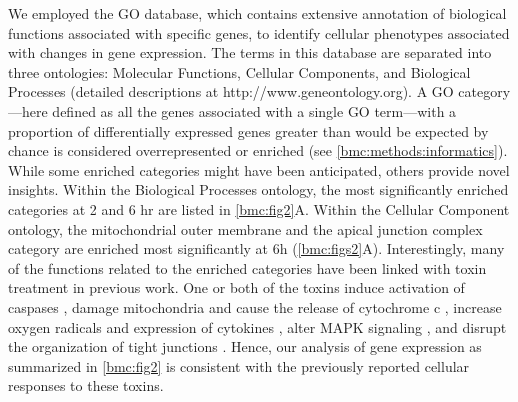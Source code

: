 We employed the GO database, which contains extensive 
annotation of biological functions associated with specific 
genes, to identify cellular phenotypes associated with 
changes in gene expression. The terms in this database are 
separated into three ontologies: Molecular Functions, Cellular 
Components, and Biological Processes (detailed descriptions 
at http://www.geneontology.org). A GO category—here defined 
as all the genes associated with a single GO term—with a 
proportion of differentially expressed genes greater than 
would be expected by chance is considered overrepresented 
or enriched (see \ref{bmc:methods:informatics}). While 
some enriched categories might have been anticipated, 
others provide novel insights. Within the Biological 
Processes ontology, the most significantly enriched 
categories at 2 and 6 hr are listed in \autoref{bmc:fig2}A. 
Within the Cellular Component ontology, the mitochondrial 
outer membrane and the apical junction complex category 
are enriched most significantly at 6h (\autoref{bmc:figs2}A). 
Interestingly, many of the functions related to the 
enriched categories have been linked with toxin treatment 
in previous work. One or both of the toxins induce 
activation of caspases 
\cite{Gerhard:2008wz, QaaposDan:2002uj, Carneiro:2006cw, Brito:2002ky}, 
damage mitochondria and cause the release of cytochrome c 
\cite{Matarrese:2007ix, He:2000uc}, increase oxygen radicals 
and expression of cytokines \cite{He:2002cl,Qiu:1999us,Flegel:1991ws}, 
alter MAPK signaling \cite{Meyer:2007kj,Lee:2007gj,Na:2005bx}, 
and disrupt the organization of tight junctions \cite{Nusrat:2001cs}. 
Hence, our analysis of gene expression as summarized in 
\autoref{bmc:fig2} is consistent with the previously reported 
cellular responses to these toxins.


